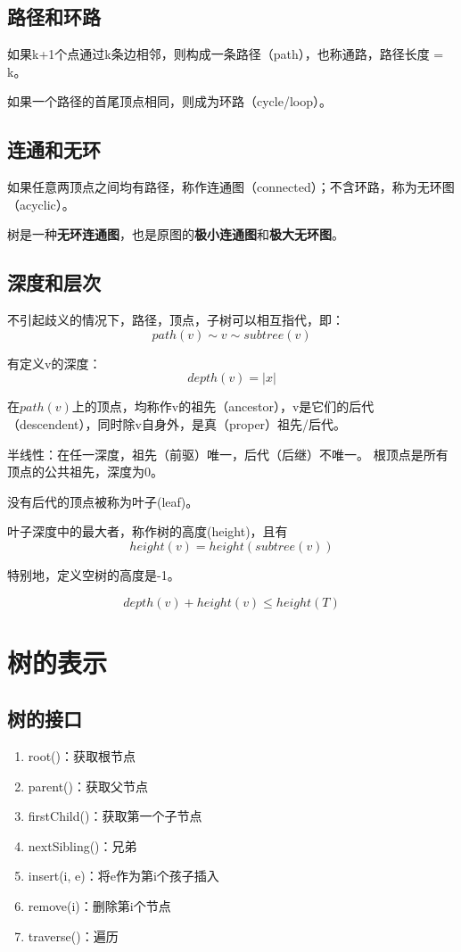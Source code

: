 \documentclass{article}
\begin{document}
\subsection{路径和环路}

如果k+1个点通过k条边相邻，则构成一条路径（path），也称通路，路径长度 = k。

如果一个路径的首尾顶点相同，则成为环路（cycle/loop）。

\subsection{连通和无环}

如果任意两顶点之间均有路径，称作连通图（connected）；不含环路，称为无环图（acyclic）。

树是一种\textbf{无环连通图}，也是原图的\textbf{极小连通图}和\textbf{极大无环图}。

\subsection{深度和层次}

不引起歧义的情况下，路径，顶点，子树可以相互指代，即：
$$path(v) \sim v \sim subtree(v)$$

有定义v的深度：
$$depth(v) = \left|x\right|$$

在$path(v)$上的顶点，均称作v的祖先（ancestor），v是它们的后代（descendent），同时除v自身外，是真（proper）祖先/后代。

半线性：在任一深度，祖先（前驱）唯一，后代（后继）不唯一。
根顶点是所有顶点的公共祖先，深度为0。

没有后代的顶点被称为叶子(leaf)。

叶子深度中的最大者，称作树的高度(height)，且有
$$height(v) = height(subtree(v))$$

特别地，定义空树的高度是-1。

$$depth(v) + height(v) \leq height(T)$$

\section{树的表示}
\subsection{树的接口}
\begin{enumerate}
  \item root()：获取根节点
  \item parent()：获取父节点
  \item firstChild()：获取第一个子节点
  \item nextSibling()：兄弟
  \item insert(i, e)：将e作为第i个孩子插入
  \item remove(i)：删除第i个节点
  \item traverse()：遍历
\end{enumerate}
\end{document}
